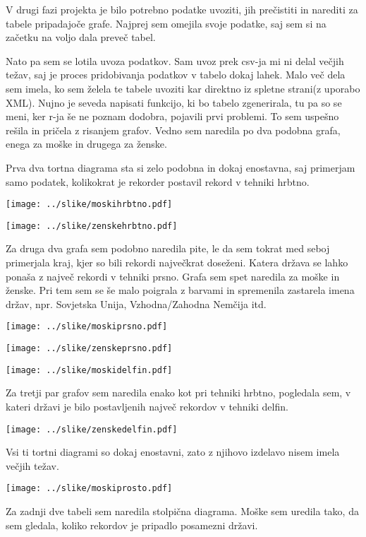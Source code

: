 \documentclass[11pt,a4paper]{article}
\begin{document}
V drugi fazi projekta je bilo potrebno podatke uvoziti, jih prečistiti in narediti za tabele pripadajoče grafe. Najprej sem omejila svoje podatke, saj sem si na začetku na voljo dala preveč tabel.

Nato pa sem se lotila uvoza podatkov. Sam uvoz prek csv-ja mi ni delal večjih težav, saj je proces pridobivanja podatkov v tabelo dokaj lahek. Malo več dela sem imela, ko sem želela te tabele uvoziti kar direktno iz spletne strani(z uporabo XML). Nujno je seveda napisati funkcijo, ki bo tabelo zgenerirala, tu pa so se meni, ker r-ja še ne poznam dodobra, pojavili prvi problemi. To sem uspešno rešila in pričela z risanjem grafov. Vedno sem naredila po dva podobna grafa, enega za moške in drugega za ženske.

Prva dva tortna diagrama sta si zelo podobna in dokaj enostavna, saj primerjam samo podatek, kolikokrat je rekorder postavil rekord v tehniki hrbtno. 


\texttt{[image: ../slike/moskihrbtno.pdf]}

\texttt{[image: ../slike/zenskehrbtno.pdf]}


Za druga dva grafa sem podobno naredila pite, le da sem tokrat med seboj primerjala kraj, kjer so bili rekordi največkrat doseženi. Katera država se lahko ponaša z največ rekordi v tehniki prsno. Grafa sem spet naredila za moške in ženske. Pri tem sem se še malo poigrala z barvami in spremenila zastarela imena držav, npr. Sovjetska Unija, Vzhodna/Zahodna Nemčija itd.

\texttt{[image: ../slike/moskiprsno.pdf]}

\texttt{[image: ../slike/zenskeprsno.pdf]}


\texttt{[image: ../slike/moskidelfin.pdf]}

Za tretji par grafov sem naredila enako kot pri tehniki hrbtno, pogledala sem, v kateri državi je bilo postavljenih največ rekordov v tehniki delfin. 

\texttt{[image: ../slike/zenskedelfin.pdf]}

Vsi ti tortni diagrami so dokaj enostavni, zato z njihovo izdelavo nisem imela večjih težav.

\texttt{[image: ../slike/moskiprosto.pdf]}

Za zadnji dve tabeli sem naredila stolpična diagrama. Moške sem uredila tako, da sem gledala, koliko rekordov je pripadlo posamezni državi.
\end{document}
